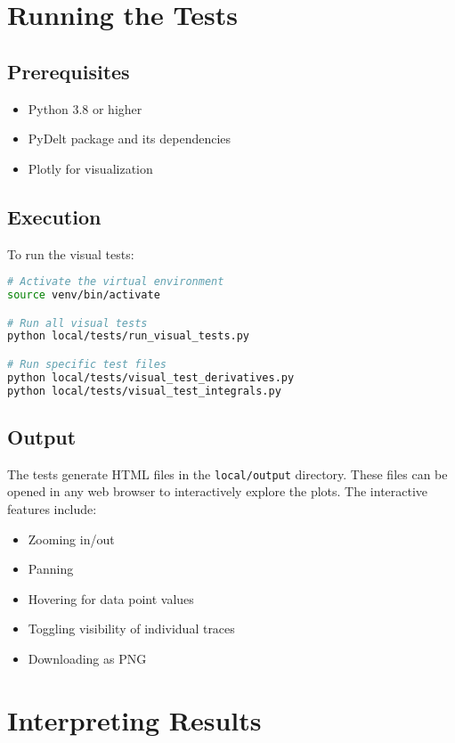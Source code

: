 \documentclass{article}
\begin{document}
\section{Running the Tests}

\subsection{Prerequisites}

\begin{itemize}
    \item Python 3.8 or higher
    \item PyDelt package and its dependencies
    \item Plotly for visualization
\end{itemize}

\subsection{Execution}

To run the visual tests:

\begin{lstlisting}[language=bash]
# Activate the virtual environment
source venv/bin/activate

# Run all visual tests
python local/tests/run_visual_tests.py

# Run specific test files
python local/tests/visual_test_derivatives.py
python local/tests/visual_test_integrals.py
\end{lstlisting}

\subsection{Output}

The tests generate HTML files in the \texttt{local/output} directory. These files can be opened in any web browser to interactively explore the plots. The interactive features include:
\begin{itemize}
    \item Zooming in/out
    \item Panning
    \item Hovering for data point values
    \item Toggling visibility of individual traces
    \item Downloading as PNG
\end{itemize}

\section{Interpreting Results}
\end{document}
